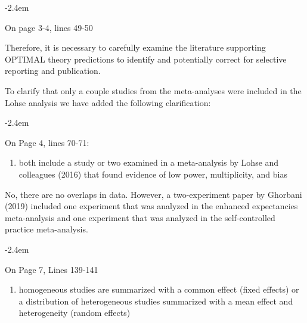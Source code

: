 \documentclass[final]{article}
\renewenvironment{quote}{\begin{fquote}\advance\leftmargini -2.4em\begin{oldquote}}{\end{oldquote}\end{fquote}}
\newenvironment{fquote}
  {\def\FrameCommand{
	\fboxsep=0.6em %
	\fcolorbox{black}{white}}%
    \MakeFramed {\advance\hsize-2\width \FrameRestore}
    \begin{minipage}{\linewidth}
  }
  {\end{minipage}\endMakeFramed}
\providecommand{\tightlist}{%
  \setlength{\itemsep}{0pt}\setlength{\parskip}{0pt}}
\begin{document}
\begin{quote}
On page 3-4, lines 49-50

Therefore, it is necessary to carefully examine the literature supporting OPTIMAL theory predictions to identify and potentially correct for selective reporting and publication.
\end{quote}

To clarify that only a couple studies from the meta-analyses were included in the Lohse analysis we have added the following clarification:

\begin{quote}
On Page 4, lines 70-71:

\begin{enumerate}
\def\labelenumi{\alph{enumi})}
\setcounter{enumi}{1}
\tightlist
\item
  both include a study or two examined in a meta-analysis by Lohse and colleagues (2016) that found evidence of low power, multiplicity, and bias
\end{enumerate}
\end{quote}


No, there are no overlaps in data. However, a two-experiment paper by Ghorbani (2019) included one experiment that was analyzed in the enhanced expectancies meta-analysis and one experiment that was analyzed in the self-controlled practice meta-analysis.



\begin{quote}
On Page 7, Lines 139-141

\begin{enumerate}
\def\labelenumi{\alph{enumi})}
\setcounter{enumi}{1}
\tightlist
\item
  homogeneous studies are summarized with a common effect (fixed effects) or a distribution of heterogeneous studies summarized with a mean effect and heterogeneity (random effects)
\end{enumerate}
\end{quote}
\end{document}
